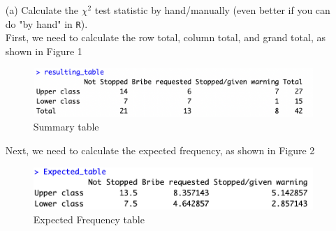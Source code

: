 \documentclass[12pt,letterpaper]{article}
\begin{document}
\begin{enumerate}
	
	\item [(a)]
	Calculate the $\chi^2$ test statistic by hand/manually (even better if you can do "by hand" in \texttt{R}).\\
	
	  First, we need to calculate the row total, column total, and grand total, as shown in Figure 1\\
	  \begin{figure}[h!]
	  	\caption{\footnotesize{Summary table}}
	  	\vspace{.5cm}
	  	\centering
	  	\label{fig:1.1 Summary table}
	  	\includegraphics[width=1.1\textwidth]{1.1.png}
	  \end{figure}
	  
	  	Next, we need to calculate the expected frequency, as shown in Figure 2\\
	  	\begin{figure}[h!]
	  	\caption{\footnotesize{Expected Frequency table}}
	  	\vspace{.5cm}
	  	\centering
	  	\label{fig:1.2 Expected Frequency table}
	  	\includegraphics[width=1.1\textwidth]{1.2.png}
	  \end{figure}
	  

\end{enumerate}
\end{document}
